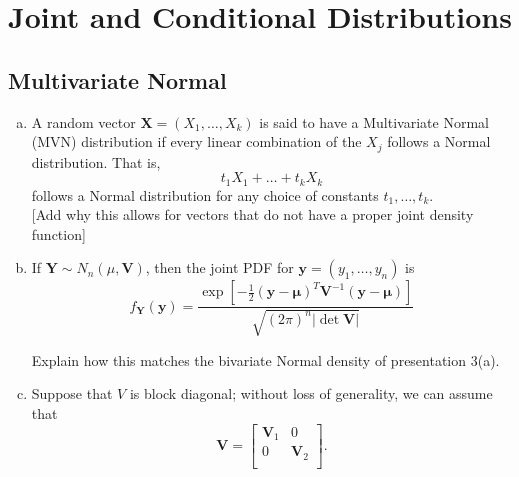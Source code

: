 \newpage

\section{Joint and Conditional Distributions}

\subsection{Multivariate Normal}

\begin{enumerate}[a)]
    \item A random vector $\mathbf{X} = (X_1, \dots, X_k)$ is said to have a Multivariate Normal (MVN) distribution if every
    linear combination of the $X_j$ follows a Normal distribution. That is,
    \[
        t_1 X_1 + \dots + t_k X_k 
    \]
    follows a Normal distribution for any choice of constants $t_1, \dots, t_k$. \\

    [Add why this allows for vectors that do not have a proper joint density function]

    \item If $\mathbf{Y} \sim N_n(\mu, \mathbf{V})$, then the joint PDF for $\mathbf{y} = (y_1, \dots, y_n)$ is
    \[
        f_{\mathbf{Y}}(\mathbf{y}) = \frac{\exp \left[ -\frac{1}{2}(\mathbf{y} -\mathbf{\mu})^T \mathbf{V}^{-1} (\mathbf{y} - \mathbf{\mu}) \right]}{\sqrt{(2\pi )^n |\det \mathbf{V}|}}
    \]

    Explain how this matches the bivariate Normal density of presentation 3(a). 

    \item Suppose that $V$ is block diagonal; without loss of generality, we can assume that
    \[
        \mathbf{V} = \begin{bmatrix}
            \mathbf{V}_1 & 0 \\
            0 & \mathbf{V}_2  \\
        \end{bmatrix}.
    \]
    

\end{enumerate}
